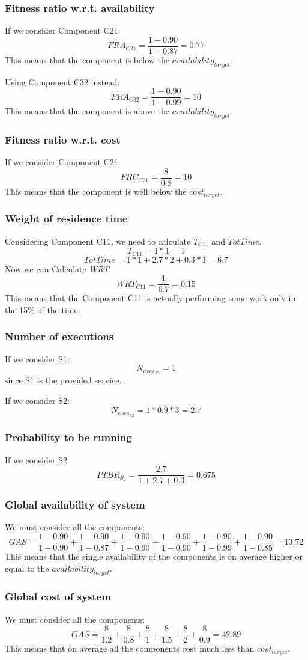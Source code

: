 \subsubsection{Fitness ratio w.r.t. availability}
If we consider Component C21:
\[ FRA_{C21} = \frac{1-0.90}{1-0.87} = 0.77 \]
This means that the component is below the \emph{$availability_{target}$}.

\noindent Using Component C32 instead:
\[ FRA_{C32} = \frac{1-0.90}{1-0.99} = 10 \]
This means that the component is above the \emph{$availability_{target}$}.
\subsubsection{Fitness ratio w.r.t. cost}
If we consider Component C21:
\[FRC_{C21} = \frac{8}{0.8}=10\]
This means that the component is well below the \emph{$cost_{target}$}.
\subsubsection{Weight of residence time}
Considering Component C11, we need to calculate $T_{C11}$ and $TotTime$.
\[T_{C11} = 1 * 1 = 1\]
\[TotTime = 1 * 1 + 2.7 * 2 + 0.3 * 1 = 6.7\]
Now we can Calculate \emph{WRT}
\[WRT_{C11} = \frac{1}{6.7} = 0.15\]
This means that the Component C11 is actually performing some work only in the 15\% of the time.
\subsubsection{Number of executions}
If we consider S1:
\[N_{exes_{S1}} = 1\]
since S1 is the provided service.

\noindent If we consider S2:
\[N_{exes_{S2}} = 1 * 0.9 * 3 = 2.7\]
\subsubsection{Probability to be running}
If we consider S2
\[PTBR_{S_2} = \frac{2.7}{1 + 2.7 + 0.3} = 0.675\]
\subsubsection{Global availability of system}
We must consider all the components:
\[GAS = \frac{1-0.90}{1-0.90} + \frac{1-0.90}{1-0.87} + \frac{1-0.90}{1-0.90} + \frac{1-0.90}{1-0.90} + \frac{1-0.90}{1-0.99} + \frac{1-0.90}{1-0.85} = 13.72\]
This means that the single availability of the components is on average higher or equal to the \emph{$availability_{target}$}.
\subsubsection{Global cost of system}
We must consider all the components:
\[GAS = \frac{8}{1.2} + \frac{8}{0.8} + \frac{8}{1} + \frac{8}{1.5} + \frac{8}{2} + \frac{8}{0.9} = 42.89\]
This means that on average all the components cost much less than \emph{$cost_{target}$}.
